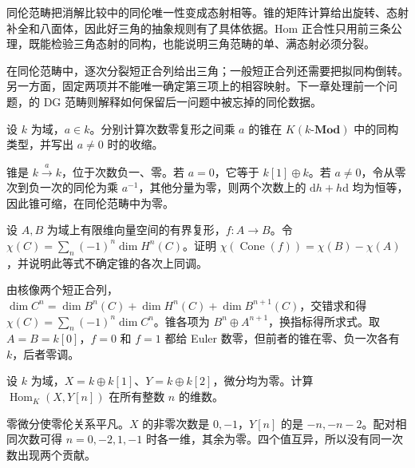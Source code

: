 \begin{chaptersummary}
	同伦范畴把消解比较中的同伦唯一性变成态射相等。锥的矩阵计算给出旋转、态射补全和八面体，因此好三角的抽象规则有了具体依据。Hom 正合性只用前三条公理，既能检验三角态射的同构，也能说明三角范畴的单、满态射必须分裂。

	\ProseParagraphBreak
	在同伦范畴中，逐次分裂短正合列给出三角；一般短正合列还需要把拟同构倒转。另一方面，固定两项并不能唯一确定第三项上的相容映射。下一章处理前一个问题，的 DG 范畴则解释如何保留后一问题中被忘掉的同伦数据。
\end{chaptersummary}

\BookExercises

\begin{exercise}\label{b4:ex:16-field-scalar}
	设 \(k\) 为域，\(a\in k\)。分别计算次数零复形之间乘 \(a\) 的锥在 \(K(k\text{-}\mathbf{Mod})\) 中的同构类型，并写出 \(a\ne0\) 时的收缩。
\end{exercise}
\begin{solution}
	锥是 \(k\xrightarrow{a}k\)，位于次数负一、零。若 \(a=0\)，它等于 \(k[1]\oplus k\)。若 \(a\ne0\)，令从零次到负一次的同伦为乘 \(a^{-1}\)，其他分量为零，则两个次数上的 \(\mathrm{d}h+h\mathrm{d}\) 均为恒等，因此锥可缩，在同伦范畴中为零。
\end{solution}

\begin{exercise}\label{b4:ex:16-cone-euler}
	设 \(A,B\) 为域上有限维向量空间的有界复形，\(f:A\to B\)。令 \(\chi(C)=\sum_n(-1)^n\dim H^n(C)\)。证明 \(\chi(\operatorname{Cone}(f))=\chi(B)-\chi(A)\)，并说明此等式不确定锥的各次上同调。
\end{exercise}
\begin{solution}
	由核像两个短正合列，\(\dim C^n=\dim B^n(C)+\dim H^n(C)+\dim B^{n+1}(C)\)，交错求和得 \(\chi(C)=\sum_n(-1)^n\dim C^n\)。锥各项为 \(B^n\oplus A^{n+1}\)，换指标得所求式。取 \(A=B=k[0]\)，\(f=0\) 和 \(f=1\) 都给 Euler 数零，但前者的锥在零、负一次各有 \(k\)，后者零调。
\end{solution}

\begin{exercise}\label{b4:ex:16-graded-hom}
	设 \(k\) 为域，\(X=k\oplus k[1]\)、\(Y=k\oplus k[2]\)，微分均为零。计算 \(\operatorname{Hom}_K(X,Y[n])\) 在所有整数 \(n\) 的维数。
\end{exercise}
\begin{solution}
	零微分使零伦关系平凡。\(X\) 的非零次数是 \(0,-1\)，\(Y[n]\) 的是 \(-n,-n-2\)。配对相同次数可得 \(n=0,-2,1,-1\) 时各一维，其余为零。四个值互异，所以没有同一次数出现两个贡献。
\end{solution}


